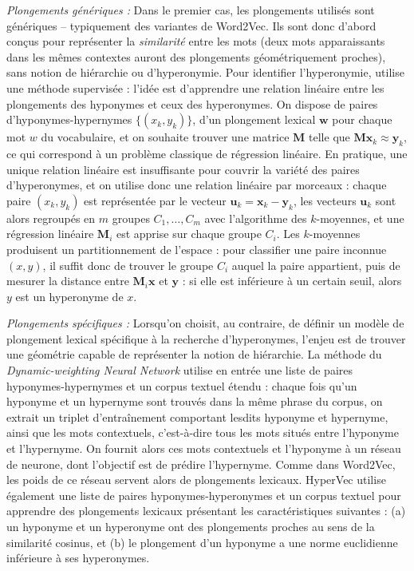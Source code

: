 \textit{Plongements génériques :}
Dans le premier cas, les plongements utilisés sont génériques – typiquement des variantes de Word2Vec. Ils sont donc d'abord conçus pour représenter la \textit{similarité} entre les mots (deux mots apparaissants dans les mêmes contextes auront des plongements géométriquement proches), sans notion de hiérarchie ou d'hyperonymie. Pour identifier l'hyperonymie, \cite{fu2014learning} utilise une méthode supervisée : l'idée est d'apprendre une relation linéaire entre les plongements des hyponymes et ceux des hyperonymes. On dispose de paires d'hyponymes-hypernymes $\{(x_k, y_k )\}$, d'un plongement lexical $\textbf{w}$ pour chaque mot $w$ du vocabulaire, et on souhaite trouver une matrice $\textbf{M}$ telle que $\textbf{M} \textbf{x}_k \approx \textbf{y}_k$, ce qui correspond à un problème classique de régression linéaire. En pratique, une unique relation linéaire est insuffisante pour couvrir la variété des paires d'hyperonymes, et on utilise donc une relation linéaire par morceaux : chaque paire $(x_k, y_k)$ est représentée par le vecteur $\textbf{u}_k = \textbf{x}_k - \textbf{y}_k$, les vecteurs $\textbf{u}_k$ sont alors regroupés en $m$ groupes $C_1, \ldots, C_m$ avec l'algorithme des $k$-moyennes, et une régression linéaire $\textbf{M}_i$ est apprise sur chaque groupe $C_i$. Les $k$-moyennes produisent un partitionnement de l'espace : pour classifier une paire inconnue $(x, y)$, il suffit donc de trouver le groupe $C_i$ auquel la paire appartient, puis de mesurer la distance entre $\textbf{M}_i \textbf{x}$ et $\textbf{y}$ : si elle est inférieure à un certain seuil, alors $y$ est un hyperonyme de $x$.


\textit{Plongements spécifiques :}
Lorsqu'on choisit, au contraire, de définir un modèle de plongement lexical spécifique à la recherche d'hyperonymes, l'enjeu est de trouver une géométrie capable de représenter la notion de hiérarchie. La méthode du \textit{Dynamic-weighting Neural Network} \cite{luu-etal-2016-learning} utilise en entrée une liste de paires hyponymes-hypernymes et un corpus textuel étendu : chaque fois qu'un hyponyme et un hypernyme sont trouvés dans la même phrase du corpus, on extrait un triplet d'entraînement comportant lesdits hyponyme et hypernyme, ainsi que les mots contextuels, c'est-à-dire tous les mots situés entre l'hyponyme et l'hypernyme. On fournit alors ces mots contextuels et l'hyponyme à un réseau de neurone, dont l'objectif est de prédire l'hypernyme. Comme dans Word2Vec, les poids de ce réseau servent alors de plongements lexicaux. HyperVec \cite{nguyen-etal-2017-hierarchical} utilise également une liste de paires hyponymes-hyperonymes et un corpus textuel pour apprendre des plongements lexicaux présentant les caractéristiques suivantes : (a) un hyponyme et un hyperonyme ont des plongements proches au sens de la similarité cosinus, et (b) le plongement d'un hyponyme a une norme euclidienne inférieure à ses hyperonymes.

